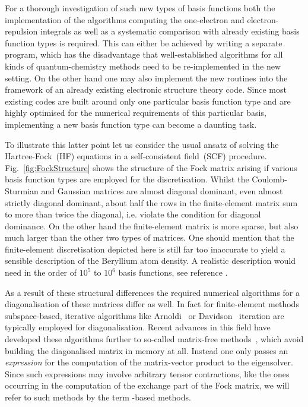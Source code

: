 For a thorough investigation of such new types of basis functions
both the implementation of the algorithms computing
the one-electron and electron-repulsion integrals
as well as a systematic comparison
with already existing basis function types is required.
This can either be achieved by writing a separate program,
which has the disadvantage that well-established algorithms
for all kinds of quantum-chemistry methods need to be re-implemented
in the new setting.
On the other hand one may also implement
the new routines into the framework of an already existing
electronic structure theory code.
Since most existing codes
are built around only one particular basis function type
and are highly optimised for the numerical requirements
of this particular basis,
implementing a new basis function type can become a daunting task.

To illustrate this latter point let us consider
the usual ansatz of solving the Hartree-Fock~(HF) equations
in a self-consistent field~(SCF) procedure.
Fig.~\ref{fig:FockStructure} shows the structure of the Fock matrix
arising if various basis function types are employed for the discretisation.
Whilst the 
Coulomb-Sturmian and Gaussian matrices are almost
diagonal dominant, even almost strictly diagonal dominant,
about half the rows in the finite-element matrix
sum to more than twice the diagonal,
i.e. violate the condition for diagonal dominance.
On the other hand the finite-element matrix is more sparse,
but also much larger than the other two types of matrices.
One should mention that the finite-element discretisation depicted here
is still far too inaccurate to yield a sensible description
of the Beryllium atom density.
A realistic description would need in the order of $10^5$ to $10^6$ basis
functions, see \eg reference \cite{Davydov2015}.

As a result of these structural differences
the required numerical algorithms for a
diagonalisation of these matrices differ as well.
In fact for finite-element methods subspace-based, iterative
algorithms like Arnoldi~\cite{Arnoldi1951} or Davidson~\cite{Davidson1975}
iteration are typically employed for diagonalisation.
Recent advances in this field have developed these algorithms
further to so-called matrix-free methods~\cite{Kronbichler2012},
which avoid building the diagonalised matrix in memory at all.
Instead one only passes an \emph{expression} for the
computation of the matrix-vector product to the eigensolver.
Since such expressions may involve arbitrary tensor contractions,
like the ones occurring in the computation of the
exchange part of the Fock matrix,
we will refer to such methods
by the term \contraction-based methods.

